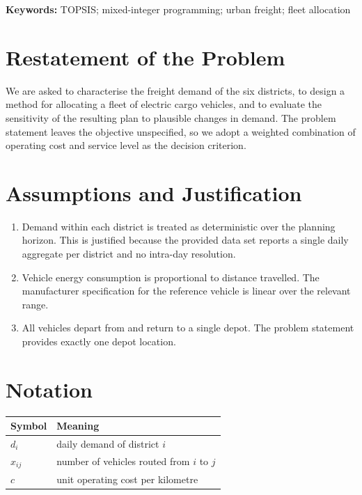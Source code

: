 \documentclass[12pt]{article}
\begin{document}
\vspace{1ex}
\textbf{Keywords:} TOPSIS; mixed-integer programming; urban freight; fleet allocation


\clearpage
\pagestyle{fancy}
\tableofcontents
\newpage
\setcounter{page}{1}

\section{Restatement of the Problem}

We are asked to characterise the freight demand of the six districts, to design a
method for allocating a fleet of electric cargo vehicles, and to evaluate the
sensitivity of the resulting plan to plausible changes in demand. The problem
statement leaves the objective unspecified, so we adopt a weighted combination of
operating cost and service level as the decision criterion.

\section{Assumptions and Justification}

\begin{enumerate}
  \item Demand within each district is treated as deterministic over the planning
        horizon. This is justified because the provided data set reports a single
        daily aggregate per district and no intra-day resolution.
  \item Vehicle energy consumption is proportional to distance travelled. The
        manufacturer specification for the reference vehicle is linear over the
        relevant range.
  \item All vehicles depart from and return to a single depot. The problem
        statement provides exactly one depot location.
\end{enumerate}

\section{Notation}

\begin{tabular}{ll}
\toprule
Symbol & Meaning \\
\midrule
$d_i$ & daily demand of district $i$ \\
$x_{ij}$ & number of vehicles routed from $i$ to $j$ \\
$c$ & unit operating cost per kilometre \\
\bottomrule
\end{tabular}
\end{document}
